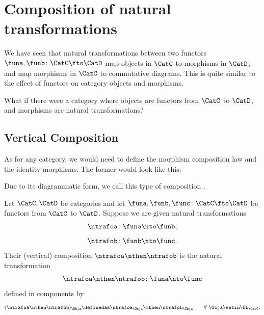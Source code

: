 \section{Composition of natural transformations}
We have seen that natural transformations between two functors $\funa, \funb \colon \CatC \fto \CatD$ map objects in $\CatC$ to morphisms in $\CatD$, and map morphisms in $\CatC$ to commutative diagrams.
This is quite similar to the effect of functors on category objects and morphisms.


What if there were a category where objects are functors from $\CatC$ to $\CatD$, and morphisms are natural transformations?

\subsection{Vertical Composition}
As for any category, we would need to define the morphism composition law and the identity morphisms.
The former would look like this:


Due to its diagrammatic form, we call this type of composition .
\begin{ctdefinition}\label{def:composition-of-naturali-tranformations}
    Let $\CatC, \CatD$ be categories and let $\funa, \funb, \func \colon \CatC \fto \CatD$ be functors from $\CatC$ to $\CatD$.
    Suppose we are given natural transformations
    \begin{equation}
        \ntrafoa \colon \funa \nto \funb,
    \end{equation}
    \begin{equation}
        \ntrafob \colon \funb \nto \func.
    \end{equation}
    Their (vertical) composition $\ntrafoa \nthen \ntrafob$ is the natural transformation
    \begin{equation}
        \ntrafoa \nthen \ntrafob \colon \funa \nto \func
    \end{equation}
    defined in components by
    \begin{equation}\label{eq:nat-trafo-composition}
        (\ntrafoa \nthen \ntrafob)_\Obja \definedas \ntrafoa_\Obja \mthen \ntrafob_\Obja \quad \quad \forall \ \Obja \setin \Ob_\CatC.
    \end{equation}
\end{ctdefinition}

